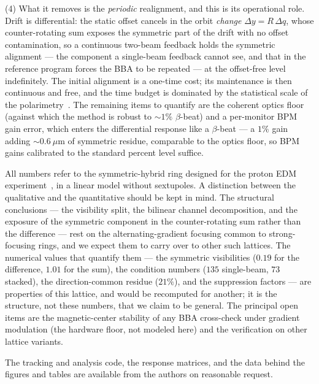 \documentclass[aps,prab,reprint,superscriptaddress,nofootinbib]{revtex4-2}
\begin{document}
(4) What it removes is the \emph{periodic} realignment, and this is its
operational role.  Drift is differential: the static offset cancels in the orbit
\emph{change} $\Delta y = R\,\Delta q$, whose counter-rotating sum exposes the
symmetric part of the drift with no offset contamination, so a continuous
two-beam feedback holds the symmetric alignment --- the component a single-beam
feedback cannot see, and that in the reference program forces the BBA to be
repeated --- at the offset-free level indefinitely.  The initial alignment is a
one-time cost; its maintenance is then continuous and free, and the time budget
is dominated by the statistical scale of the polarimetry~\cite{polarimeter}.
The remaining items to quantify are the coherent optics floor (against which the
method is robust to $\sim\!1\%$ $\beta$-beat) and a per-monitor BPM gain error,
which enters the differential response like a $\beta$-beat --- a $1\%$ gain
adding $\sim\!0.6~\mu$m of symmetric residue, comparable to the optics floor, so
BPM gains calibrated to the standard percent level suffice.

All numbers refer to the symmetric-hybrid ring designed for the proton EDM
experiment~\cite{omarov}, in a linear model without sextupoles.  A distinction
between the qualitative and the quantitative should be kept in mind.  The
structural conclusions --- the visibility split, the bilinear channel
decomposition, and the exposure of the symmetric component in the
counter-rotating sum rather than the difference --- rest on the
alternating-gradient focusing common to strong-focusing rings, and we expect
them to carry over to other such lattices.  The numerical values that quantify
them --- the symmetric visibilities ($0.19$ for the difference, $1.01$ for the
sum), the condition numbers ($135$ single-beam, $73$ stacked), the
direction-common residue ($21\%$), and the suppression factors --- are
properties of this lattice, and would be recomputed for another; it is the
structure, not these numbers, that we claim to be general.  The principal open
items are the magnetic-center stability of any BBA cross-check under gradient
modulation (the hardware floor, not modeled here) and the verification on other
lattice variants.

The tracking and analysis code, the response matrices, and the data behind the
figures and tables are available from the authors on reasonable request.


\begin{acknowledgments}
%
\end{acknowledgments}
\end{document}
